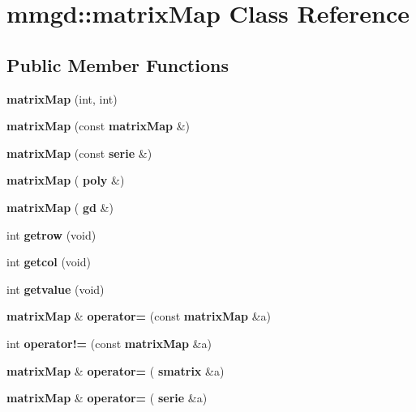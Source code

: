 \section{mmgd\+:\+:matrix\+Map Class Reference}
\label{classmmgd_1_1matrix_map}
\subsection*{Public Member Functions}
\begin{DoxyCompactItemize}
\item 
\mbox{\label{classmmgd_1_1matrix_map_ab3b089f38937b7e1c47c8fa3f6bed6fb}} 
{\bfseries matrix\+Map} (int, int)
\item 
\mbox{\label{classmmgd_1_1matrix_map_a7ee45575048822a235b50e94c9a94fb4}} 
{\bfseries matrix\+Map} (const \textbf{ matrix\+Map} \&)
\item 
\mbox{\label{classmmgd_1_1matrix_map_a64b0df7eb3c4986187d29c84cec0c904}} 
{\bfseries matrix\+Map} (const \textbf{ serie} \&)
\item 
\mbox{\label{classmmgd_1_1matrix_map_a390970a165a3b502404fe0cd887a0e9e}} 
{\bfseries matrix\+Map} (\textbf{ poly} \&)
\item 
\mbox{\label{classmmgd_1_1matrix_map_a0269c321f7c2c02c9222d777245781fd}} 
{\bfseries matrix\+Map} (\textbf{ gd} \&)
\item 
\mbox{\label{classmmgd_1_1matrix_map_a691b2e66d6c38b47d07fcba3a72d4c47}} 
int {\bfseries getrow} (void)
\item 
\mbox{\label{classmmgd_1_1matrix_map_a38ae7a1e3252878fee9149659f1aee13}} 
int {\bfseries getcol} (void)
\item 
\mbox{\label{classmmgd_1_1matrix_map_aa7dfd17dc3386c37b513f0247697d4b0}} 
int {\bfseries getvalue} (void)
\item 
\mbox{\label{classmmgd_1_1matrix_map_ad847db7e0e7008d7b5ca3aefbf68edb6}} 
\textbf{ matrix\+Map} \& {\bfseries operator=} (const \textbf{ matrix\+Map} \&a)
\item 
\mbox{\label{classmmgd_1_1matrix_map_ae7c7c0796163419bc601a7c886218e10}} 
int {\bfseries operator!=} (const \textbf{ matrix\+Map} \&a)
\item 
\mbox{\label{classmmgd_1_1matrix_map_ab1ff96d60bdf14a5c2c7e682c9ef5f60}} 
\textbf{ matrix\+Map} \& {\bfseries operator=} (\textbf{ smatrix} \&a)
\item 
\mbox{\label{classmmgd_1_1matrix_map_ab812235070bb2333967054b046dcbf8c}} 
\textbf{ matrix\+Map} \& {\bfseries operator=} (\textbf{ serie} \&a)

\end{DoxyCompactItemize}
